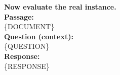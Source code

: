 \begin{tcolorbox}[
    enhanced,
    colback=white,
    colframe=black,
    arc=5mm,
    boxrule=1pt,
    left=2mm,
    right=2mm,
    top=1mm,
    bottom=1mm
]
\textbf{Now evaluate the real instance.}\\

\textbf{Passage:}\\
\{DOCUMENT\}\\

\textbf{Question (context):}\\
\{QUESTION\}\\

\textbf{Response:}\\
\{RESPONSE\}\\

\end{tcolorbox}
